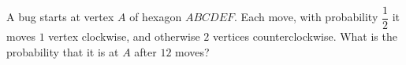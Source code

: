 A bug starts at vertex $A$ of hexagon $ABCDEF$. Each move, with probability $\dfrac12$ it moves $1$ vertex clockwise, and otherwise $2$ vertices counterclockwise. What is the probability that it is at $A$ after $12$ moves?
